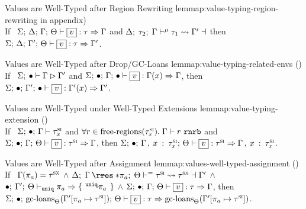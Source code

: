 \begin{oxlemma}{Values are Well-Typed after Region Rewriting}
  {lemmap:value-typing-region-rewriting}
   in appendix) \hfill \\
  If \ $\oxtypjudge{\oxglobalctx}{\oxtvarctx}{\oxkontctx}{\oxvarctx}
  {\oxvalue}{\oxtype}{\oxvarctx}$ and
  $\oxtunify{\oxtvarctx}{\oxvarctx}{\oxtype_2}{\oxtype_1}{\oxvarctx^\prime}$
  then $\oxtypjudge{\oxglobalctx}{\oxtvarctx}{\oxkontctx}{\oxvarctx^\prime}
  {\oxvalue}{\oxtype}{\oxvarctx^\prime}$.
\end{oxlemma}

\begin{oxlemma}{Values are Well-Typed after Drop/GC-Loans}
  {lemmap:value-typing-related-envs}
  () \hfill \\
  If \ $\Sigma; \: \bullet \vdash \Gamma \rhd \Gamma^\prime$ and
  $\oxtypjudge{\oxglobalctx}{\oxemptyctx}{\oxemptyctx}{\oxvarctx}
  {\oxvalue}{\oxvarctx(x)}{\oxvarctx}$, then
  $\oxtypjudge{\oxglobalctx}{\oxemptyctx}{\oxemptyctx}{\oxvarctx^\prime} {\oxvalue}{\oxvarctx^\prime(x)}{\oxvarctx^\prime}$.
\end{oxlemma}

\begin{oxlemma}{Values are Well-Typed under Well-Typed Extensions}
  {lemmap:value-typing-extension}
  () \hfill \\
  If \ $\Sigma; \, \bullet; \, \Gamma \vdash \tau^\textsc{si}_x$ and
  $\forall r \in \textrm{free-regions}(\tau^\textsc{si}_x). \;
  \Gamma \vdash r \ \mathtt{rnrb}$ and
  $\oxtypjudge{\oxglobalctx}{\oxemptyctx}{\oxkontctx}{\oxvarctx}
  {\oxvalue}{\oxsitype}{\oxvarctx}$, then
  $\oxtypjudge{\oxglobalctx}{\oxemptyctx}{\oxkontctx}{ \oxextendctx{\oxvarctx}{
      \oxvarctxentry{\oxid}{\oxsitype_\oxid} } }{\oxvalue}{\oxsitype}{
    \oxextendctx{\oxvarctx}{ \oxvarctxentry{\oxid}{\oxsitype_\oxid} } }$.
\end{oxlemma}

\begin{oxlemma}{Values are Well-Typed after Assignment}
  {lemmap:values-well-typed-assignment}
  () \hfill \\
  If \ $\Gamma(\pi_a) = \tau^\textsc{sx}$ $\wedge$
  $\oxtunify[\oxnoop]{\oxtvarctx}{\oxkontctx}{
    \oxrsub{\oxvarctx}{\oxderef{\oxplace_a}}
  }{\oxsitype}{\oxsxtype}{\oxvarctx^\prime}$ $\wedge$
  $\bullet; \: \Gamma^\prime; \: \Theta \vdash_{\mathtt{uniq}} \pi_a \Rightarrow 
    \{ \: \,^{\mathtt{uniq}}\pi_a\, \: \}
  $ $\wedge$
  $\oxtypjudge{\oxglobalctx}{\oxemptyctx}{\oxkontctx}{\oxvarctx}
  {\oxvalue}{\oxtype}{\oxvarctx}$, then
  $\oxtypjudge{\oxglobalctx}{\oxemptyctx}{\oxkontctx}{
    \oxgcloans{\oxkontctx}{\oxtupdate{\oxvarctx^\prime}{\oxplace_a}{\oxsitype}}
  }{
    \oxvalue
  }{\oxtype}{
    \oxgcloans{\oxkontctx}{\oxtupdate{\oxvarctx^\prime}{\oxplace_a}{\oxsitype}}
  }$.
\end{oxlemma}

